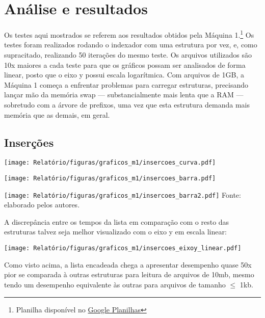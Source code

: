\chapter{Análise  e resultados}\label{cap-analise-resultado}

Os testes aqui mostrados se referem aos resultados obtidos pela Máquina 1.\footnote{Planilha disponível no \href{https://docs.google.com/spreadsheets/d/1yzVdhAuRN6BSb2E2VDG79fv59cQ-DlLtYV5bvRnVaVQ/edit?usp=sharing}{Google Planilhas}} Os testes foram realizados rodando o indexador com uma estrutura por vez, e, como supracitado, realizando 50 iterações do mesmo teste. Os arquivos utilizados são 10x maiores a cada teste para que os gráficos possam ser analisados de forma linear, posto que o eixo y possui escala logarítmica. Com arquivos de 1GB, a Máquina 1 começa a enfrentar problemas para carregar estruturas, precisando lançar mão da memória swap --- substancialmente mais lenta que a RAM --- sobretudo com a árvore de prefixos, uma vez que esta estrutura demanda mais memória que as demais, em geral.

\section{Inserções}

\begin{center}\label{graf_ins_curva}
    \texttt{[image: Relatório/figuras/graficos\_m1/insercoes\_curva.pdf]}
\end{center}

\begin{center}\label{graf_ins_barra}
    \texttt{[image: Relatório/figuras/graficos\_m1/insercoes\_barra.pdf]}
\end{center}

\begin{center}\label{graf_ins_barra2}
    \texttt{[image: Relatório/figuras/graficos\_m1/insercoes\_barra2.pdf]}
    \small{Fonte: elaborado pelos autores.}
\end{center}

A discrepância entre os tempos da lista em comparação com o resto das estruturas talvez seja melhor visualizado com o eixo y em escala linear:
\begin{center}\label{graf_ins_eixoylinear}
    \texttt{[image: Relatório/figuras/graficos\_m1/insercoes\_eixoy\_linear.pdf]}
\end{center}

Como visto acima, a lista encadeada chega a apresentar desempenho quase 50x pior se comparada à outras estruturas para leitura de arquivos de 10mb, mesmo tendo um desempenho equivalente às outras para arquivos de tamanho $\leq$ 1kb.

